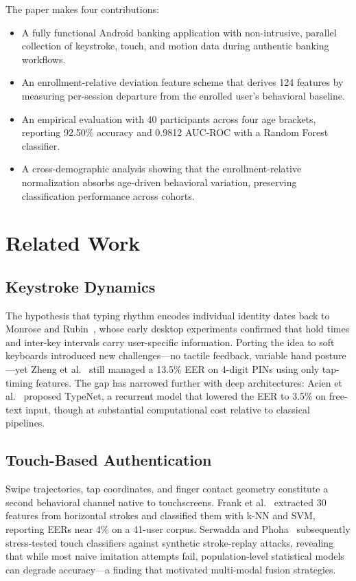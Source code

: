\documentclass[conference]{IEEEtran}
\begin{document}
The paper makes four contributions:
\begin{itemize}
    \item A fully functional Android banking application with non-intrusive, parallel collection of keystroke, touch, and motion data during authentic banking workflows.
    \item An enrollment-relative deviation feature scheme that derives 124 features by measuring per-session departure from the enrolled user's behavioral baseline.
    \item An empirical evaluation with 40 participants across four age brackets, reporting 92.50\% accuracy and 0.9812 AUC-ROC with a Random Forest classifier.
    \item A cross-demographic analysis showing that the enrollment-relative normalization absorbs age-driven behavioral variation, preserving classification performance across cohorts.
\end{itemize}

\section{Related Work}

\subsection{Keystroke Dynamics}
The hypothesis that typing rhythm encodes individual identity dates back to Monrose and Rubin~\cite{monrose1997keystroke}, whose early desktop experiments confirmed that hold times and inter-key intervals carry user-specific information. Porting the idea to soft keyboards introduced new challenges---no tactile feedback, variable hand posture---yet Zheng et al.~\cite{zheng2014mobile} still managed a 13.5\% EER on 4-digit PINs using only tap-timing features. The gap has narrowed further with deep architectures: Acien et al.~\cite{acien2021typenet} proposed TypeNet, a recurrent model that lowered the EER to 3.5\% on free-text input, though at substantial computational cost relative to classical pipelines.

\subsection{Touch-Based Authentication}
Swipe trajectories, tap coordinates, and finger contact geometry constitute a second behavioral channel native to touchscreens. Frank et al.~\cite{frank2013touchalytics} extracted 30 features from horizontal strokes and classified them with k-NN and SVM, reporting EERs near 4\% on a 41-user corpus. Serwadda and Phoha~\cite{serwadda2013examining} subsequently stress-tested touch classifiers against synthetic stroke-replay attacks, revealing that while most naive imitation attempts fail, population-level statistical models can degrade accuracy---a finding that motivated multi-modal fusion strategies.
\end{document}
